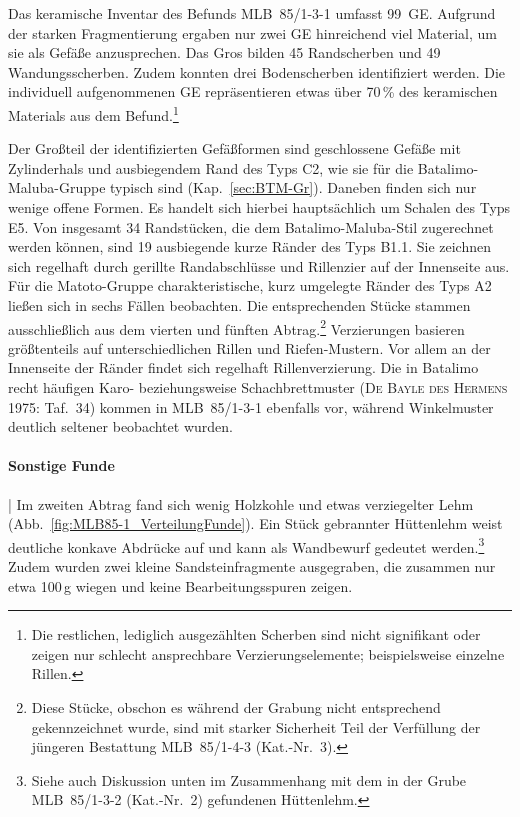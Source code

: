 Das keramische Inventar des Befunds MLB~85/1-3-1 umfasst 99~GE. Aufgrund der starken Fragmentierung ergaben nur zwei GE hinreichend viel Material, um sie als Gefäße anzusprechen. Das Gros bilden 45 Randscherben und 49 Wandungsscherben. Zudem konnten drei Bodenscherben identifiziert werden. Die individuell aufgenommenen GE repräsentieren etwas über 70\,\% des keramischen Materials aus dem Befund.\footnote{Die restlichen, lediglich ausgezählten Scherben sind nicht signifikant oder zeigen nur schlecht ansprechbare Verzierungselemente; beispielsweise einzelne Rillen.}\columnbreak

Der Großteil der identifizierten Gefäßformen sind geschlossene Gefäße mit Zylinderhals und ausbiegendem Rand des Typs C2, wie sie für die Batalimo-Maluba-Gruppe typisch sind (Kap.~\ref{sec:BTM-Gr}). Daneben finden sich nur wenige offene Formen. Es handelt sich hierbei hauptsächlich um Schalen des Typs E5. Von insgesamt 34 Randstücken, die dem Batalimo-Maluba-Stil zugerechnet werden können, sind 19 ausbiegende kurze Ränder des Typs B1.1. Sie zeichnen sich regelhaft durch gerillte Randabschlüsse und Rillenzier auf der Innenseite aus. Für die Matoto-Gruppe charakteristische, kurz umgelegte Ränder des Typs A2 ließen sich in sechs Fällen beobachten. Die entsprechenden Stücke stammen ausschließlich aus dem vierten und fünften Abtrag.\footnote{Diese Stücke, obschon es während der Grabung nicht entsprechend gekennzeichnet wurde, sind mit starker Sicherheit Teil der Verfüllung der jüngeren Bestattung MLB~85/1-4-3 (Kat.-Nr.~3).} Verzierungen basieren größtenteils auf unterschiedlichen Rillen und Riefen-Mustern. Vor allem an der Innenseite der Ränder findet sich regelhaft Rillenverzierung. Die in Batalimo recht häufigen Karo- beziehungsweise Schachbrettmuster (\textsc{De Bayle des Hermens} 1975: Taf.~34) kommen in MLB~85/1-3-1 ebenfalls vor, während Winkelmuster deutlich seltener beobachtet wurden.

\paragraph{Sonstige Funde}\hspace{-.5em}|\hspace{.5em}%
Im zweiten Abtrag fand sich wenig Holzkohle und etwas verziegelter Lehm (Abb.~\ref{fig:MLB85-1_VerteilungFunde}). Ein Stück gebrannter Hüttenlehm weist deutliche konkave Abdrücke auf und kann als Wandbewurf gedeutet werden.\footnote{Siehe auch Diskussion unten im Zusammenhang mit dem in der Grube MLB~85/1-3-2 (Kat.-Nr.~2) gefundenen Hüttenlehm.} Zudem wurden zwei kleine Sandsteinfragmente ausgegraben, die zusammen nur etwa 100\,g wiegen und keine Bearbeitungsspuren zeigen.

